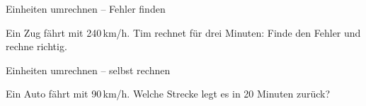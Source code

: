 \begin{aufgabe}{Einheiten umrechnen – Fehler finden}
\begin{teile}
\teil Ein Zug fährt mit 240\,km/h. Tim rechnet für drei Minuten:  Finde den Fehler und rechne richtig.
\end{teile}
\end{aufgabe}

\begin{aufgabe}{Einheiten umrechnen – selbst rechnen}
\begin{teile}
\teil Ein Auto fährt mit 90\,km/h. Welche Strecke legt es in 20 Minuten zurück? \leerfeld[km]
\end{teile}
\end{aufgabe}
